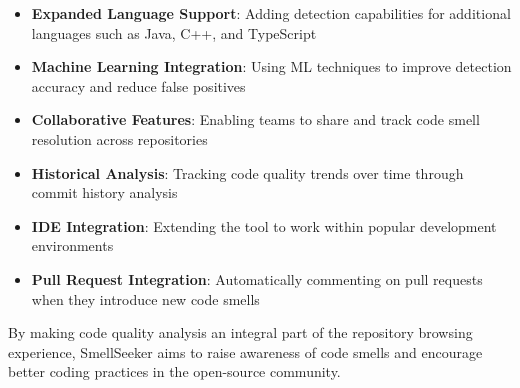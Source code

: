 \documentclass[sigconf,screen]{acmart}
\begin{document}
\begin{itemize}
    \item \textbf{Expanded Language Support}: Adding detection capabilities for additional languages such as Java, C++, and TypeScript
    \item \textbf{Machine Learning Integration}: Using ML techniques to improve detection accuracy and reduce false positives
    \item \textbf{Collaborative Features}: Enabling teams to share and track code smell resolution across repositories
    \item \textbf{Historical Analysis}: Tracking code quality trends over time through commit history analysis
    \item \textbf{IDE Integration}: Extending the tool to work within popular development environments
    \item \textbf{Pull Request Integration}: Automatically commenting on pull requests when they introduce new code smells
\end{itemize}

By making code quality analysis an integral part of the repository browsing experience, SmellSeeker aims to raise awareness of code smells and encourage better coding practices in the open-source community.
\end{document}
